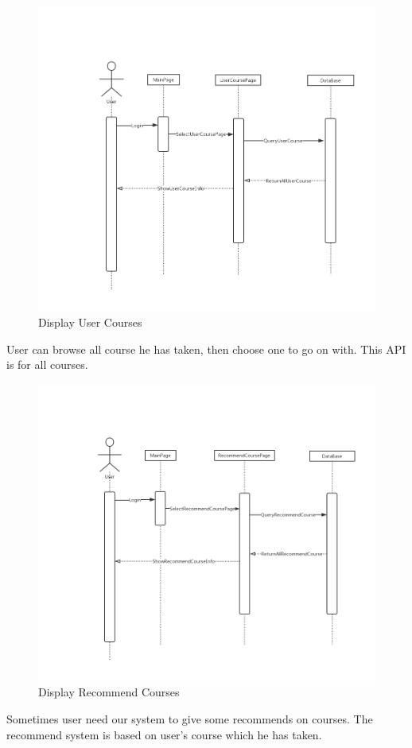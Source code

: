 \documentclass[16pt]{scrreprt}
\begin{document}
\begin{figure}[H]
    \includegraphics[width=\linewidth]{./FuncPhoto/7.png}   
    \caption{Display User Courses}
\end{figure}
User can browse all course he has taken, then choose one to go on with. This API is for all courses. 

\begin{figure}[H]
    \includegraphics[width=\linewidth]{./FuncPhoto/8.png}   
    \caption{Display Recommend Courses}
\end{figure}
Sometimes user need our system to give some recommends on courses. The recommend system is based on user's course which he has taken.
\end{document}
